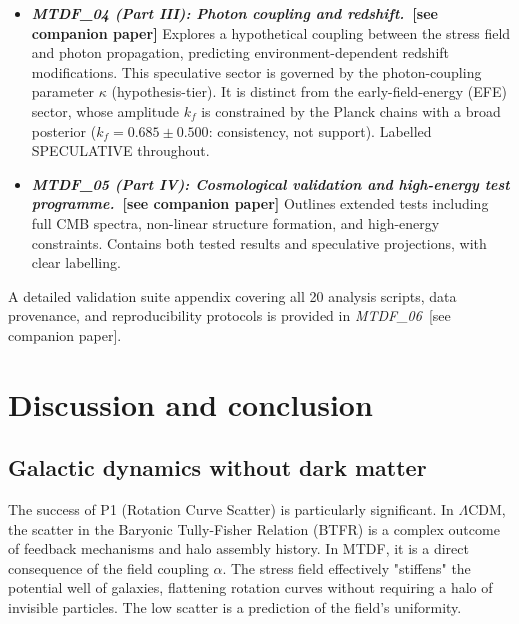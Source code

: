 \documentclass[11pt,a4paper]{article}
\begin{document}
\begin{itemize}
  \item \textbf{\textit{MTDF\_\allowbreak{}04 (Part III): Photon coupling and redshift.}~[see companion paper]} Explores a hypothetical coupling between the stress field and photon propagation, predicting environment-dependent redshift modifications. This speculative sector is governed by the photon-coupling parameter $\kappa$ (hypothesis-tier). It is distinct from the early-field-energy (EFE) sector, whose amplitude $k_f$ is constrained by the Planck chains with a broad posterior ($k_f = 0.685 \pm 0.500$: consistency, not support). Labelled SPECULATIVE throughout.
  \item \textbf{\textit{MTDF\_\allowbreak{}05 (Part IV): Cosmological validation and high-energy test programme.}~[see companion paper]} Outlines extended tests including full CMB spectra, non-linear structure formation, and high-energy constraints. Contains both tested results and speculative projections, with clear labelling.
\end{itemize}

A detailed validation suite appendix covering all 20 analysis scripts, data provenance, and reproducibility protocols is provided in \textit{MTDF\_\allowbreak{}06}~[see companion paper].

\section{Discussion and conclusion}
\label{sec:sec13}

\subsection{Galactic dynamics without dark matter}
The success of P1 (Rotation Curve Scatter) is particularly significant. In $\Lambda$CDM, the scatter in the Baryonic Tully-Fisher Relation (BTFR) is a complex outcome of feedback mechanisms and halo assembly history. In MTDF, it is a direct consequence of the field coupling $\alpha$. The stress field effectively "stiffens" the potential well of galaxies, flattening rotation curves without requiring a halo of invisible particles. The low scatter is a prediction of the field's uniformity.
\end{document}
